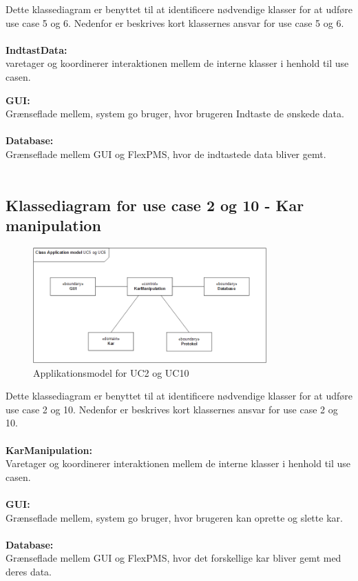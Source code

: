 Dette klassediagram er benyttet til at identificere nødvendige klasser for at udføre use case 5 og 6.
Nedenfor er beskrives kort klassernes ansvar for use case 5 og 6.
\\\\
\textbf{IndtastData:}\\
varetager og koordinerer interaktionen mellem de interne klasser i henhold til use casen.

\textbf{GUI:}\\
Grænseflade mellem, system go bruger, hvor brugeren Indtaste de ønskede data. 
\\\\

\textbf{Database:}\\
Grænseflade mellem GUI og FlexPMS, hvor de  indtastede data bliver gemt. 
\\\\

\subsection{Klassediagram for use case 2 og 10 - Kar manipulation}

\begin{figure}[H]
    \centering
    \includegraphics[width=0.8\textwidth]{Systemarkitektur/KlasseDiagrammer/2+10_KarManipulate.png}
    \caption{Applikationsmodel for UC2 og UC10}
    \label{fig:app_uc210}
\end{figure}

Dette klassediagram er benyttet til at identificere nødvendige klasser for at udføre use case 2 og 10.
Nedenfor er beskrives kort klassernes ansvar for use case 2 og 10.
\\\\
\textbf{KarManipulation:}\\
Varetager og koordinerer interaktionen mellem de interne klasser i henhold til use casen.
\\\\
\textbf{GUI:}\\
Grænseflade mellem, system go bruger, hvor brugeren kan oprette og slette kar. 
\\\\

\textbf{Database:}\\
Grænseflade mellem GUI og FlexPMS, hvor det forskellige kar bliver gemt med deres data. 
\\\\